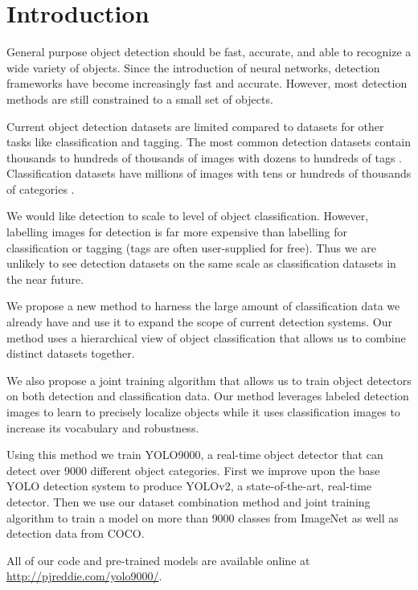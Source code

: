 \documentclass[10pt,twocolumn,letterpaper]{article}
\begin{document}
\section{Introduction}

General purpose object detection should be fast, accurate, and able to recognize a wide variety of objects. Since the introduction of neural networks, detection frameworks have become increasingly fast and accurate. However, most detection methods are still constrained to a small set of objects.

Current object detection datasets are limited compared to datasets for other tasks like classification and tagging. The most common detection datasets contain thousands to hundreds of thousands of images with dozens to hundreds of tags \cite{voc} \cite{coco} \cite{deng2009imagenet}. Classification datasets have millions of images with tens or hundreds of thousands of categories \cite{tag} \cite{deng2009imagenet}.

We would like detection to scale to level of object classification. However, labelling images for detection is far more expensive than labelling for classification or tagging (tags are often user-supplied for free). Thus we are unlikely to see detection datasets on the same scale as classification datasets in the near future.

We propose a new method to harness the large amount of classification data we already have and use it to expand the scope of current detection systems. Our method uses a hierarchical view of object classification that allows us to combine distinct datasets together.


We also propose a joint training algorithm that allows us to train object detectors on both detection and classification data. Our method leverages labeled detection images to learn to precisely localize objects while it uses classification images to increase its vocabulary and robustness.

Using this method we train YOLO9000, a real-time object detector that can detect over 9000 different object categories. First we improve upon the base YOLO detection system to produce YOLOv2, a state-of-the-art, real-time detector. Then we use our dataset combination method and joint training algorithm to train a model on more than 9000 classes from ImageNet as well as detection data from COCO.

All of our code and pre-trained models are available online at \url{http://pjreddie.com/yolo9000/}.
\end{document}
